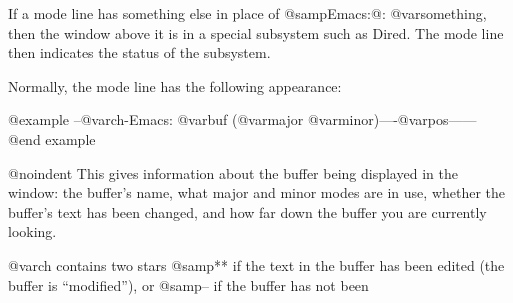   If a mode line has something else in place of @samp{Emacs:@: @var{something}},
then the window above it is in a special subsystem such as Dired.  The mode
line then indicates the status of the subsystem.

  Normally, the mode line has the following appearance:

@example
--@var{ch}-Emacs: @var{buf}      (@var{major} @var{minor})----@var{pos}------
@end example

@noindent
This gives information about the buffer being displayed in the window: the
buffer's name, what major and minor modes are in use, whether the buffer's
text has been changed, and how far down the buffer you are currently
looking.

  @var{ch} contains two stars @samp{**} if the text in the buffer has been
edited (the buffer is ``modified''), or @samp{--} if the buffer has not been
